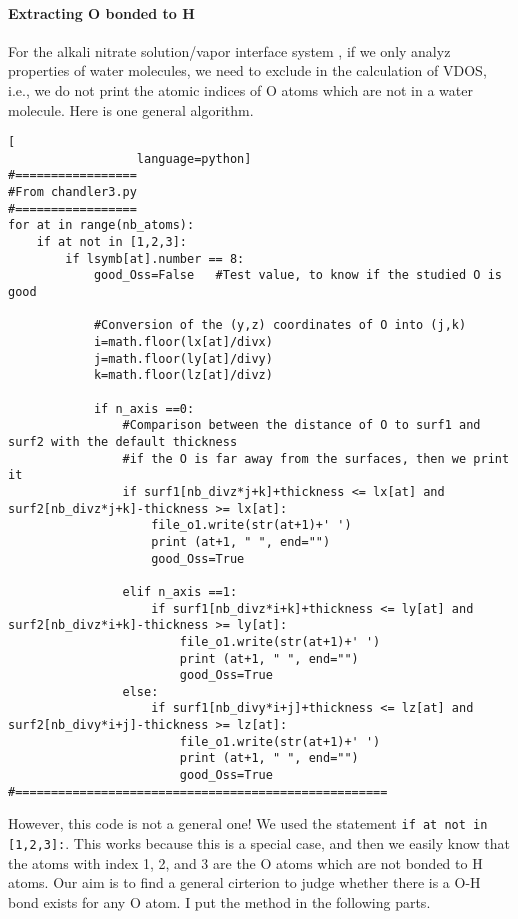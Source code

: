 \paragraph{Extracting O bonded to H} \label{Extracting O bonded to H}
For the alkali nitrate solution/vapor interface system , if we only analyz properties of water molecules, we need to exclude \nitrate in the calculation of VDOS, i.e., we do not print the atomic indices of O atoms which are not in a water molecule. Here is one general algorithm. 
\begin{lstlisting}[                                                                                          
                  language=python]
#=================
#From chandler3.py
#=================
for at in range(nb_atoms):
    if at not in [1,2,3]:
        if lsymb[at].number == 8:
            good_Oss=False   #Test value, to know if the studied O is good 

            #Conversion of the (y,z) coordinates of O into (j,k)
            i=math.floor(lx[at]/divx)
            j=math.floor(ly[at]/divy)
            k=math.floor(lz[at]/divz)

            if n_axis ==0:
                #Comparison between the distance of O to surf1 and surf2 with the default thickness
                #if the O is far away from the surfaces, then we print it
                if surf1[nb_divz*j+k]+thickness <= lx[at] and surf2[nb_divz*j+k]-thickness >= lx[at]:
                    file_o1.write(str(at+1)+' ')
                    print (at+1, " ", end="")
                    good_Oss=True

                elif n_axis ==1:
                    if surf1[nb_divz*i+k]+thickness <= ly[at] and  surf2[nb_divz*i+k]-thickness >= ly[at]:
                        file_o1.write(str(at+1)+' ')
                        print (at+1, " ", end="")
                        good_Oss=True
                else:
                    if surf1[nb_divy*i+j]+thickness <= lz[at] and surf2[nb_divy*i+j]-thickness >= lz[at]:
                        file_o1.write(str(at+1)+' ')
                        print (at+1, " ", end="")
                        good_Oss=True
#====================================================
\end{lstlisting}
%
However, this code is not a general one! 
We used the statement \texttt{if at not in [1,2,3]:}. 
This works because this is a special case, and then we easily know 
that the atoms with index 1, 2, and 3 are the O atoms which are not bonded to H atoms. 
Our aim is to find a general cirterion to judge whether there is a O-H bond exists for any O atom. 
I put the method in the following parts.

